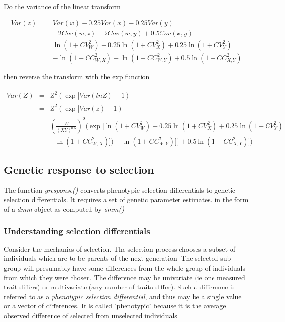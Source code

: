 \documentclass[titlepage]{article}  %
\begin{document}
Do the variance of the linear transform

\begin{eqnarray*}
Var(z) & = & Var(w) - 0.25 Var(x) - 0.25 Var(y) \\
       &   &  - 2 Cov(w,z) - 2 Cov(w,y) + 0.5 Cov(x,y) \\
       & = & \ln(1 + CV^{2}_{W}) + 0.25 \ln(1 + CV^{2}_{X}) + 0.25 \ln(1 + CV^{2}_{Y}) \\
       &   &  - \ln(1 + CC^{2}_{W,X}) - \ln(1 + CC^{2}_{W,Y}) + 0.5 \ln(1 + CC^{2}_{X,Y}) 
\end{eqnarray*}

then reverse the transform with the exp function

\begin{eqnarray*}
Var(Z) & = & \bar{Z^{2}}(\exp[Var(lnZ) - 1) \\
       & = & \bar{Z^{2}}(\exp[Var(z) - 1) \\
       & = & \bar{(\frac{W}{(XY)^{0.5}})^{2}}(\exp[\ln(1+CV^{2}_{W}) + 0.25 \ln(1 + CV^{2}_{X}) + 0.25 \ln(1 + CV^{2}_{Y}) \\
       &   &  - \ln(1 + CC^{2}_{W,X})]) - \ln(1 + CC^{2}_{W,Y})]) + 0.5 \ln(1 + CC^{2}_{X,Y})])
\end{eqnarray*}




\clearpage
\subsection{Genetic response to selection}

The function {\em gresponse()} converts phenotypic selection differentials to genetic selection differentials. It requires a set of genetic parameter estimates, in the form of a {\em dmm} object as computed by {\em dmm()}.

\subsubsection{Understanding selection differentials}
 Consider the mechanics of selection. The selection process chooses a subset of individuals which are to be parents of the next generation. The selected sub-group will presumably have some differences from the whole group of individuals from which they were chosen. The difference may be univariate (ie one measured trait differs) or multivariate (any number of traits differ). Such a difference is referred to as a {\em phenotypic selection differential}, and thus may be a single value or a vector of differences. It is called 'phenotypic' because it is the average observed difference of selected from unselected individuals.
\end{document}
